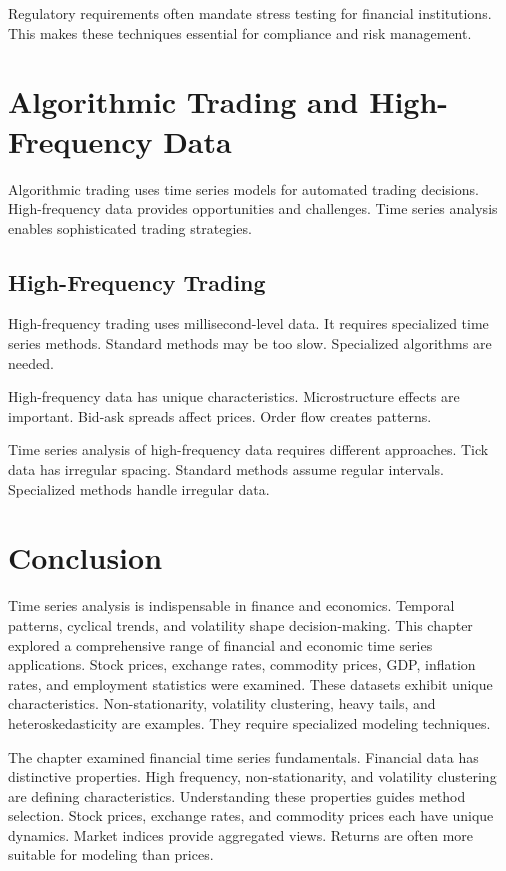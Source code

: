 Regulatory requirements often mandate stress testing for financial institutions. This makes these techniques essential for compliance and risk management.

\section{Algorithmic Trading and High-Frequency Data}

Algorithmic trading uses time series models for automated trading decisions. High-frequency data provides opportunities and challenges. Time series analysis enables sophisticated trading strategies.

\subsection{High-Frequency Trading}

High-frequency trading uses millisecond-level data. It requires specialized time series methods. Standard methods may be too slow. Specialized algorithms are needed.

High-frequency data has unique characteristics. Microstructure effects are important. Bid-ask spreads affect prices. Order flow creates patterns.

Time series analysis of high-frequency data requires different approaches. Tick data has irregular spacing. Standard methods assume regular intervals. Specialized methods handle irregular data.

\section{Conclusion}

Time series analysis is indispensable in finance and economics. Temporal patterns, cyclical trends, and volatility shape decision-making. This chapter explored a comprehensive range of financial and economic time series applications. Stock prices, exchange rates, commodity prices, GDP, inflation rates, and employment statistics were examined. These datasets exhibit unique characteristics. Non-stationarity, volatility clustering, heavy tails, and heteroskedasticity are examples. They require specialized modeling techniques.

The chapter examined financial time series fundamentals. Financial data has distinctive properties. High frequency, non-stationarity, and volatility clustering are defining characteristics. Understanding these properties guides method selection. Stock prices, exchange rates, and commodity prices each have unique dynamics. Market indices provide aggregated views. Returns are often more suitable for modeling than prices.

